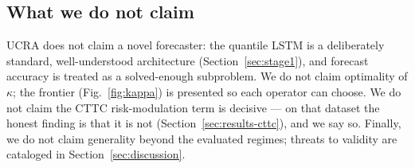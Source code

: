 \subsection{What we do not claim}

UCRA does not claim a novel forecaster: the quantile LSTM is a
deliberately standard, well-understood architecture
(Section~\ref{sec:stage1}), and forecast accuracy is treated as a
solved-enough subproblem. We do not claim optimality of $\kappa$; the
frontier (Fig.~\ref{fig:kappa}) is presented so each operator can
choose. We do not claim the CTTC risk-modulation term is decisive ---
on that dataset the honest finding is that it is not
(Section~\ref{sec:results-cttc}), and we say so. Finally, we do not
claim generality beyond the evaluated regimes; threats to validity
are cataloged in Section~\ref{sec:discussion}.
